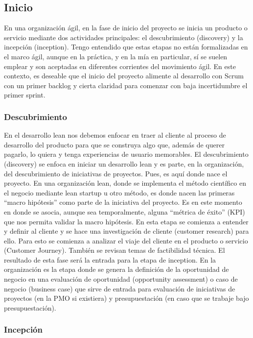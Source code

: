 \subsection{Inicio}

En una organización ágil, en la fase de inicio del proyecto se inicia un producto o servicio mediante dos actividades principales: el descubrimiento (discovery) y la incepción (inception). Tengo entendido que estas etapas no están formalizadas en el marco ágil, aunque en la práctica, y en la mía en particular, sí se suelen emplear y son aceptadas en diferentes corrientes del movimiento ágil. En este contexto, es deseable que el inicio del proyecto alimente al desarrollo con Scrum con un primer backlog y cierta claridad para comenzar con baja incertidumbre el primer sprint. 

\subsubsection{Descubrimiento}

En el desarrollo lean nos debemos enfocar en traer al cliente al proceso de desarrollo del producto para que se construya algo que, además de querer pagarlo, lo quiera y tenga experiencias de usuario memorables. El descubrimiento (discovery) se enfoca en iniciar un desarrollo lean y es parte, en la organización, del descubrimiento de iniciativas de proyectos. Pues, es aquí donde nace el proyecto. En una organización lean, donde se implementa el método científico en el negocio mediante lean startup u otro método, es donde nacen las primeras “macro hipótesis” como parte de la iniciativa del proyecto. Es en este momento en donde se asocia, aunque sea temporalmente, alguna “métrica de éxito” (KPI) que nos permita validar la macro hipótesis. En esta etapa se comienza a entender y definir al cliente y se hace una investigación de cliente (customer research) para ello. Para esto se comienza a analizar el viaje del cliente en el producto o servicio (Customer Journey). También se revisan temas de factibilidad técnica. El resultado de esta fase será la entrada para la etapa de inception. En la organización es la etapa donde se genera la definición de la oportunidad de negocio en una evaluación de oportunidad (opportunity assessment) o caso de negocio (business case) que sirve de entrada para evaluación de iniciativas de proyectos (en la PMO si existiera) y presupuestación (en caso que se trabaje bajo presupuestación).

\subsubsection{Incepción}


